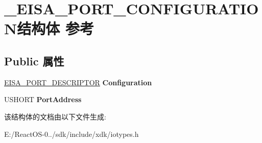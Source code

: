 \hypertarget{struct___e_i_s_a___p_o_r_t___c_o_n_f_i_g_u_r_a_t_i_o_n}{}\section{\+\_\+\+E\+I\+S\+A\+\_\+\+P\+O\+R\+T\+\_\+\+C\+O\+N\+F\+I\+G\+U\+R\+A\+T\+I\+O\+N结构体 参考}
\label{struct___e_i_s_a___p_o_r_t___c_o_n_f_i_g_u_r_a_t_i_o_n}
\subsection*{Public 属性}
\begin{DoxyCompactItemize}
\item 
\mbox{\label{struct___e_i_s_a___p_o_r_t___c_o_n_f_i_g_u_r_a_t_i_o_n_a98cc26f3dea83c398256504dac94b9b6}} 
\hyperlink{struct___e_i_s_a___p_o_r_t___d_e_s_c_r_i_p_t_o_r}{E\+I\+S\+A\+\_\+\+P\+O\+R\+T\+\_\+\+D\+E\+S\+C\+R\+I\+P\+T\+OR} {\bfseries Configuration}
\item 
\mbox{\label{struct___e_i_s_a___p_o_r_t___c_o_n_f_i_g_u_r_a_t_i_o_n_a1c2e8ea1defc1cc97cd382625d61c5cc}} 
U\+S\+H\+O\+RT {\bfseries Port\+Address}
\end{DoxyCompactItemize}


该结构体的文档由以下文件生成\+:\begin{DoxyCompactItemize}
\item 
E\+:/\+React\+O\+S-\/0../sdk/include/xdk/iotypes.\+h\end{DoxyCompactItemize}
